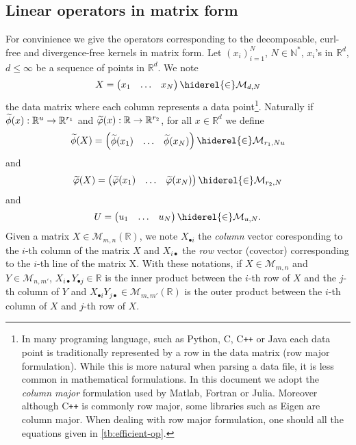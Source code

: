 \subsection{Linear operators in matrix form}
For convinience we give the operators corresponding to the decomposable,
curl-free and divergence-free kernels in matrix form. Let $(x_i)_{i=1}^N$,
$N\in\mathbb{N}^*$, $x_i$'s in $\mathbb{R}^d$, $d\le\infty$ be a sequence of
points in $\mathbb{R}^d$. We note
\begin{dmath*}
    X=\begin{pmatrix}x_1 & \hdots &
    x_N\end{pmatrix}\hiderel{\in}\mathcal{M}_{d,N}
\end{dmath*}
the data matrix where each column represents a data point\footnote{In many
programing language, such as Python, C, C{}\verb!++! or Java each data point is
traditionally represented by a row in the data matrix (row major formulation).
While this is more natural when parsing a data file, it is less common in
mathematical formulations. In this document we adopt the \emph{column major}
formulation used by Matlab, Fortran or Julia. Moreover although C{}\verb!++! is
commonly row major, some libraries such as Eigen are column major. When dealing
with row major formulation, one should  all the equations given
in \cref{tb:efficient-op}.}. Naturally if
$\tildePhi{\omega}(x):\mathbb{R}^u\to\mathbb{R}^{r_1}$ and
$\widetilde{\varphi}(x):\mathbb{R}\to\mathbb{R}^{r_2}$, for all
$x\in\mathbb{R}^d$ we define
\begin{dmath*}
    \tildePhi{\omega}(X)=\begin{pmatrix}\tildePhi{\omega}(x_1) & \hdots &
    \tildePhi{\omega}(x_N)\end{pmatrix}\hiderel{\in}\mathcal{M}_{r_1,Nu}
\end{dmath*}
and
\begin{dmath*}
    \tildephi{\omega}(X)=\begin{pmatrix}\tildephi{\omega}(x_1) & \hdots &
    \tildephi{\omega}(x_N)\end{pmatrix}\hiderel{\in}\mathcal{M}_{r_2, N}
\end{dmath*}
and
\begin{dmath*}
    U=\begin{pmatrix} u_1 & \hdots&  u_N
    \end{pmatrix}\hiderel{\in}\mathcal{M}_{u, N}.
\end{dmath*}
Given a matrix $X\in\mathcal{M}_{m,n}(\mathbb{R})$, we note $X_{\bullet i}$ the
\emph{column} vector coresponding to the $i$-th column of the matrix $X$ and
$X_{i \bullet}$ the \emph{row} vector (covector) corresponding to the $i$-th
line of the matrix X. With these notations, if $X\in\mathcal{M}_{m,n}$ and
$Y\in\mathcal{M}_{n,m'}$, $X_{i\bullet}Y_{\bullet j}\in\mathbb{R}$ is the inner
product between the $i$-th row of $X$ and the $j$-th column of $Y$ and
$X_{\bullet i} Y_{j \bullet}\in\mathcal{M}_{m,m'}(\mathbb{R})$ is the outer
product between the $i$-th column of $X$ and $j$-th row of $X$.
